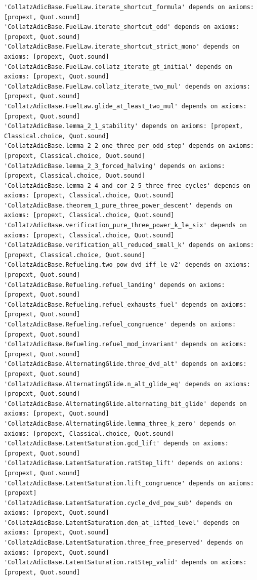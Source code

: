 \documentclass[11pt,a4paper]{article}
\begin{document}
\begin{lstlisting}
'CollatzAdicBase.FuelLaw.iterate_shortcut_formula' depends on axioms: [propext, Quot.sound]
'CollatzAdicBase.FuelLaw.iterate_shortcut_odd' depends on axioms: [propext, Quot.sound]
'CollatzAdicBase.FuelLaw.iterate_shortcut_strict_mono' depends on axioms: [propext, Quot.sound]
'CollatzAdicBase.FuelLaw.collatz_iterate_gt_initial' depends on axioms: [propext, Quot.sound]
'CollatzAdicBase.FuelLaw.collatz_iterate_two_mul' depends on axioms: [propext, Quot.sound]
'CollatzAdicBase.FuelLaw.glide_at_least_two_mul' depends on axioms: [propext, Quot.sound]
'CollatzAdicBase.lemma_2_1_stability' depends on axioms: [propext, Classical.choice, Quot.sound]
'CollatzAdicBase.lemma_2_2_one_three_per_odd_step' depends on axioms: [propext, Classical.choice, Quot.sound]
'CollatzAdicBase.lemma_2_3_forced_halving' depends on axioms: [propext, Classical.choice, Quot.sound]
'CollatzAdicBase.lemma_2_4_and_cor_2_5_three_free_cycles' depends on axioms: [propext, Classical.choice, Quot.sound]
'CollatzAdicBase.theorem_1_pure_three_power_descent' depends on axioms: [propext, Classical.choice, Quot.sound]
'CollatzAdicBase.verification_pure_three_power_k_le_six' depends on axioms: [propext, Classical.choice, Quot.sound]
'CollatzAdicBase.verification_all_reduced_small_k' depends on axioms: [propext, Classical.choice, Quot.sound]
'CollatzAdicBase.Refueling.two_pow_dvd_iff_le_v2' depends on axioms: [propext, Quot.sound]
'CollatzAdicBase.Refueling.refuel_landing' depends on axioms: [propext, Quot.sound]
'CollatzAdicBase.Refueling.refuel_exhausts_fuel' depends on axioms: [propext, Quot.sound]
'CollatzAdicBase.Refueling.refuel_congruence' depends on axioms: [propext, Quot.sound]
'CollatzAdicBase.Refueling.refuel_mod_invariant' depends on axioms: [propext, Quot.sound]
'CollatzAdicBase.AlternatingGlide.three_dvd_alt' depends on axioms: [propext, Quot.sound]
'CollatzAdicBase.AlternatingGlide.n_alt_glide_eq' depends on axioms: [propext, Quot.sound]
'CollatzAdicBase.AlternatingGlide.alternating_bit_glide' depends on axioms: [propext, Quot.sound]
'CollatzAdicBase.AlternatingGlide.lemma_three_k_zero' depends on axioms: [propext, Classical.choice, Quot.sound]
'CollatzAdicBase.LatentSaturation.gcd_lift' depends on axioms: [propext, Quot.sound]
'CollatzAdicBase.LatentSaturation.ratStep_lift' depends on axioms: [propext, Quot.sound]
'CollatzAdicBase.LatentSaturation.lift_congruence' depends on axioms: [propext]
'CollatzAdicBase.LatentSaturation.cycle_dvd_pow_sub' depends on axioms: [propext, Quot.sound]
'CollatzAdicBase.LatentSaturation.den_at_lifted_level' depends on axioms: [propext, Quot.sound]
'CollatzAdicBase.LatentSaturation.three_free_preserved' depends on axioms: [propext, Quot.sound]
'CollatzAdicBase.LatentSaturation.ratStep_valid' depends on axioms: [propext, Quot.sound]
\end{lstlisting}
\end{document}
